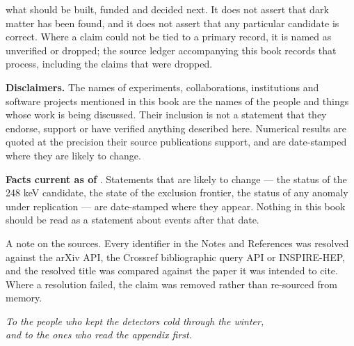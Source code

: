 what should be built, funded and decided next. It does not assert that dark
matter has been found, and it does not assert that any particular candidate is
correct. Where a claim could not be tied to a primary record, it is named as
unverified or dropped; the source ledger accompanying this book records that
process, including the claims that were dropped.\par
\vspace{10pt}
\noindent\textbf{Disclaimers.} The names of experiments, collaborations,
institutions and software projects mentioned in this book are the names of the
people and things whose work is being discussed. Their inclusion is not a
statement that they endorse, support or have verified anything described here.
Numerical results are quoted at the precision their source publications
support, and are date-stamped where they are likely to change.\par
\vspace{10pt}
\noindent\textbf{Facts current as of} \bookFactsDate. Statements that are likely
to change --- the status of the 248 keV candidate, the state of the exclusion
frontier, the status of any anomaly under replication --- are date-stamped
where they appear. Nothing in this book should be read as a statement about
events after that date.\par
\vspace{8pt}
\noindent{\color{accent}\rule{\textwidth}{0.4pt}}\par
\vspace{8pt}
{\small\color{txtdim}\sffamily
\noindent A note on the sources. Every identifier in the Notes and References was
resolved against the arXiv API, the Crossref bibliographic query API or
INSPIRE-HEP, and the resolved title was compared against the paper it was
intended to cite. Where a resolution failed, the claim was removed rather than
re-sourced from memory.\par}

\clearpage
\thispagestyle{empty}
\vspace*{2.5in}
  \begin{center}
    {\large\itshape\color{txt}
      To the people who kept the detectors cold through the winter,\\
      \hspace*{1em}and to the ones who read the appendix first.\par}
  \end{center}
  \vfill
\clearpage

